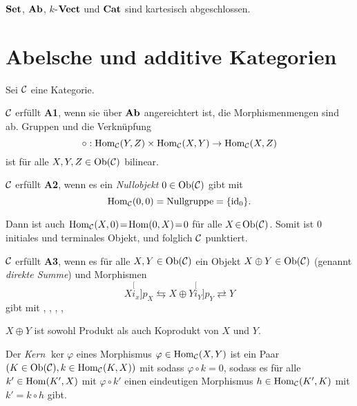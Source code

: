 \documentclass{cheat-sheet}
\begin{document}
\begin{bspe}
  $\mathbf{Set}$, $\mathbf{Ab}$, $k$-$\mathbf{Vect}$ und $\mathbf{Cat}$ sind kartesisch abgeschlossen.
\end{bspe}


\section{Abelsche und additive Kategorien}

Sei $\mathcal{C}$ eine Kategorie.

\begin{axiom}
  $\mathcal{C}$ erfüllt \textbf{A1}, wenn sie über $\mathbf{Ab}$ angereichtert ist, \dh{} die Morphismenmengen sind ab. Gruppen und die Verknüpfung
  \[ \circ : \operatorname{Hom}_{\mathcal{C}}(Y, Z) \times \operatorname{Hom}_{\mathcal{C}}(X, Y) \to \operatorname{Hom}_{\mathcal{C}}(X, Z) \]
  ist für alle $X, Y, Z \in \operatorname{Ob}(\mathcal{C})$ bilinear.
\end{axiom}

\begin{axiom}
  $\mathcal{C}$ erfüllt \textbf{A2}, wenn es ein \emph{Nullobjekt} $0 \in \operatorname{Ob}(\mathcal{C})$ gibt mit
  \[ \operatorname{Hom}_{\mathcal{C}}(0, 0) = \text{Nullgruppe} = \{ \operatorname{id}_0 \}. \]
\end{axiom}

\begin{bem}
  Dann ist auch $\operatorname{Hom}_{\mathcal{C}}(X, 0) \!=\! \operatorname{Hom}(0, X) \!=\! 0$ für alle $X \!\in\! \operatorname{Ob}(\mathcal{C})$.
  Somit ist $0$ initiales und terminales Objekt, und folglich $\mathcal{C}$ punktiert.
\end{bem}

\begin{axiom}
  $\mathcal{C}$ erfüllt \textbf{A3}, wenn es für alle $X, Y \in \operatorname{Ob}(\mathcal{C})$ ein Objekt $X \oplus Y \in \operatorname{Ob}(\mathcal{C})$ (genannt \emph{direkte Summe}) und Morphismen
  \[ X \stackrel[i_x]{p_X}{\leftrightarrows} X \oplus Y \stackrel[i_Y]{p_Y}{\rightleftarrows} Y \]
  gibt mit
  , \enspace
  , \enspace
  , \enspace
  , \enspace
\end{axiom}

\begin{bem}
  $X \oplus Y$ ist sowohl Produkt als auch Koprodukt von $X$ und $Y$.
\end{bem}


\begin{defn}
  Der \emph{Kern} $\ker \varphi$ eines Morphismus $\varphi \in \operatorname{Hom}_{\mathcal{C}}(X, Y)$ ist
  ein Paar $(K \in \operatorname{Ob}(\mathcal{C}), k \in \operatorname{Hom}_{\mathcal{C}}(K, X))$ mit
  sodass $\varphi \circ k = 0$, sodass es für alle $k' \in \operatorname{Hom}(K', X)$ mit $\varphi \circ k'$ einen eindeutigen Morphismus $h \in \operatorname{Hom}_{\mathcal{C}}(K', K)$ mit $k' = k \circ h$ gibt.
\end{defn}
\end{document}
